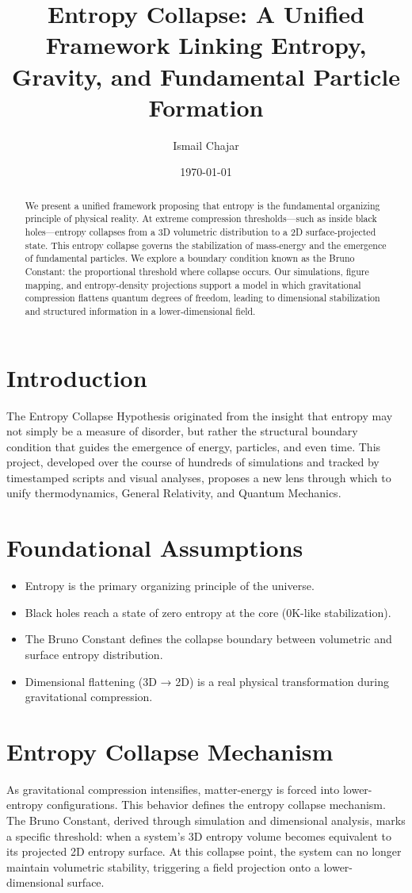 \documentclass[12pt]{article}
\title{Entropy Collapse: A Unified Framework Linking Entropy, Gravity, and Fundamental Particle Formation}
\author{Ismail Chajar}
\date{\today}
\begin{document}
\maketitle
\begin{abstract}
We present a unified framework proposing that entropy is the fundamental organizing principle of physical reality. At extreme compression thresholds—such as inside black holes—entropy collapses from a 3D volumetric distribution to a 2D surface-projected state. This entropy collapse governs the stabilization of mass-energy and the emergence of fundamental particles. We explore a boundary condition known as the Bruno Constant: the proportional threshold where collapse occurs. Our simulations, figure mapping, and entropy-density projections support a model in which gravitational compression flattens quantum degrees of freedom, leading to dimensional stabilization and structured information in a lower-dimensional field.
\end{abstract}

\tableofcontents
\section{Introduction}
The Entropy Collapse Hypothesis originated from the insight that entropy may not simply be a measure of disorder, but rather the structural boundary condition that guides the emergence of energy, particles, and even time. This project, developed over the course of hundreds of simulations and tracked by timestamped scripts and visual analyses, proposes a new lens through which to unify thermodynamics, General Relativity, and Quantum Mechanics.
\section{Foundational Assumptions}
\begin{itemize}
    \item Entropy is the primary organizing principle of the universe.
    \item Black holes reach a state of zero entropy at the core (0K-like stabilization).
    \item The Bruno Constant defines the collapse boundary between volumetric and surface entropy distribution.
    \item Dimensional flattening (3D → 2D) is a real physical transformation during gravitational compression.
\end{itemize}

\section{Entropy Collapse Mechanism}
As gravitational compression intensifies, matter-energy is forced into lower-entropy configurations. This behavior defines the entropy collapse mechanism. The Bruno Constant, derived through simulation and dimensional analysis, marks a specific threshold: when a system's 3D entropy volume becomes equivalent to its projected 2D entropy surface. At this collapse point, the system can no longer maintain volumetric stability, triggering a field projection onto a lower-dimensional surface.
\end{document}
